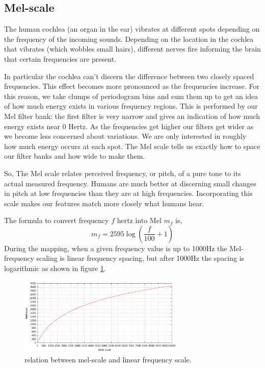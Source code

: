\documentclass[12pt, a4paper, twoside]{report}
\begin{document}
\subsection{Mel-scale}
The human cochlea (an organ in the ear) vibrates at different spots depending on the frequency of the incoming sounds. Depending on the location in the cochlea that vibrates (which wobbles small hairs), different nerves fire informing the brain that certain frequencies are present.
\par
In particular the cochlea can't discern the difference between two closely spaced frequencies. This effect becomes more pronounced as the frequencies increase. For this reason, we take clumps of periodogram bins and sum them up to get an idea of how much energy exists in various frequency regions. This is performed by our Mel filter bank: the first filter is very narrow and gives an indication of how much energy exists near 0 Hertz. As the frequencies get higher our filters get wider as we become less concerned about variations. We are only interested in roughly how much energy occurs at each spot. The Mel scale tells us exactly how to space our filter banks and how wide to make them.
\par
So, The Mel scale relates perceived frequency, or pitch, of a pure tone to its actual measured frequency. Humans are much better at discerning small changes in pitch at low frequencies than they are at high frequencies. Incorporating this scale makes our features match more closely what humans hear.
\par
The formula to convert frequency $f$ hertz into Mel $m_f$ is,  
\begin{equation*}
m_f = 2595\log \left ( \frac{f}{100} + 1 \right )
\end{equation*}
During the mapping, when a given frequency value is up to 1000Hz  the  Mel-frequency  scaling  is  linear  frequency  spacing,  but  after  1000Hz  the  spacing  is logarithmic as shown in figure \ref{fig:mel-scale}.
\begin{figure}[!h]
	\centering
	\includegraphics[width=0.7\textwidth]
	{images/chapter3/mel-scale}
	\caption{relation between mel-scale and linear  frequency scale.}
	\label{fig:mel-scale}
\end{figure}
\end{document}
